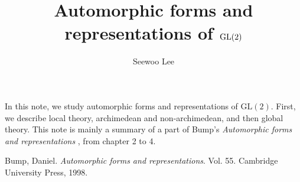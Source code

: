 \documentclass{article}
\title{Automorphic forms and representations of $\GL(2)$}
\author{Seewoo Lee}
\newcommand{\GL}{\mathrm{GL}}
\begin{document}
\maketitle
In this note, we study automorphic forms and representations of $\GL(2)$. First, we describe local theory, archimedean and non-archimedean, and then global theory. This note is mainly a summary of a  part of  Bump's \emph{Automorphic forms and representations} \cite{bu}, from chapter 2 to 4. 


\tableofcontents






\begin{thebibliography}{5}

 Bump, Daniel. \emph{Automorphic forms and representations}. Vol. 55. Cambridge University Press, 1998.


\end{thebibliography}
\end{document}
